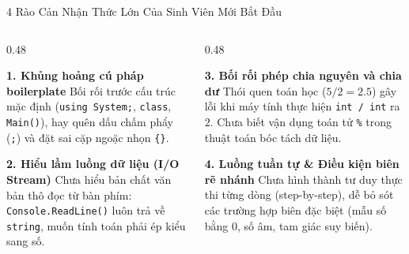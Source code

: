 \documentclass[aspectratio=169, 10pt]{beamer}
\begin{document}
\begin{frame}{4 Rào Cản Nhận Thức Lớn Của Sinh Viên Mới Bắt Đầu}
  \begin{columns}[T]
    \begin{column}{0.48\textwidth}
      \begin{alertblock}{\textbf{1. Khủng hoảng cú pháp boilerplate}}
        Bối rối trước cấu trúc mặc định (\texttt{using System;}, \texttt{class}, \texttt{Main()}), hay quên dấu chấm phẩy (\texttt{;}) và đặt sai cặp ngoặc nhọn \texttt{\{\}}.
      \end{alertblock}
      \begin{alertblock}{\textbf{2. Hiểu lầm luồng dữ liệu (I/O Stream)}}
        Chưa hiểu bản chất văn bản thô đọc từ bàn phím: \texttt{Console.ReadLine()} luôn trả về \texttt{string}, muốn tính toán phải ép kiểu sang số.
      \end{alertblock}
    \end{column}
    \begin{column}{0.48\textwidth}
      \begin{alertblock}{\textbf{3. Bối rối phép chia nguyên và chia dư}}
        Thói quen toán học ($5/2 = 2.5$) gây lỗi khi máy tính thực hiện \texttt{int / int} ra $2$. Chưa biết vận dụng toán tử \texttt{\%} trong thuật toán bóc tách dữ liệu.
      \end{alertblock}
      \begin{alertblock}{\textbf{4. Luồng tuần tự \& Điều kiện biên rẽ nhánh}}
        Chưa hình thành tư duy thực thi từng dòng (step-by-step), dễ bỏ sót các trường hợp biên đặc biệt (mẫu số bằng 0, số âm, tam giác suy biến).
      \end{alertblock}
    \end{column}
  \end{columns}
\end{frame}
\end{document}

